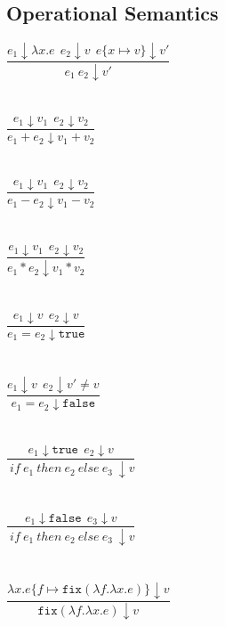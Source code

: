 \documentclass{westhesis}
\theoremstyle{plain}
\theoremstyle{definition}
\begin{document}
\begin{HEAD}
\section{Operational Semantics} 
$\dfrac{e_1 \downarrow \lambda x.e \ \ e_2 \downarrow v \ \ e\{x \mapsto v\} \downarrow v'}{e_1 \ e_2 \downarrow v'}$ \\ \\ \\
$\dfrac{e_1 \downarrow v_1 \ \ e_2 \downarrow v_2}{e_1 + e_2 \downarrow v_1 + v_2}$ \\ \\ \\
$\dfrac{e_1 \downarrow v_1 \ \ e_2 \downarrow v_2}{e_1 - e_2 \downarrow v_1 - v_2}$ \\ \\ \\
$\dfrac{e_1 \downarrow v_1 \ \ e_2 \downarrow v_2}{e_1 * e_2 \downarrow v_1 * v_2}$ \\ \\ \\
$\dfrac{e_1 \downarrow v \ \ e_2 \downarrow v}{e_1 = e_2 \downarrow \texttt{true}}$ \\ \\ \\
$\dfrac{e_1 \downarrow v \ \ e_2 \downarrow v' \neq v}{e_1 = e_2 \downarrow \texttt{false}}$ \\ \\ \\
$\dfrac{e_1 \downarrow \texttt{true} \ \ e_2 \downarrow v}{\ if \ e_1 \ then \ e_2 \ else \ e_3 \ \downarrow v}$ \\ \\ \\
$\dfrac{e_1 \downarrow \texttt{false} \ \ e_3 \downarrow v}{\ if \ e_1 \ then \ e_2 \ else \ e_3 \ \downarrow v}$ \\ \\ \\
$\dfrac{\lambda x.e\{ f \mapsto \texttt{fix}(\lambda f.\lambda x.e)\} \downarrow v}{\texttt{fix} (\lambda f.\lambda x.e) \downarrow 
v}$


\end{HEAD}
\end{document}
